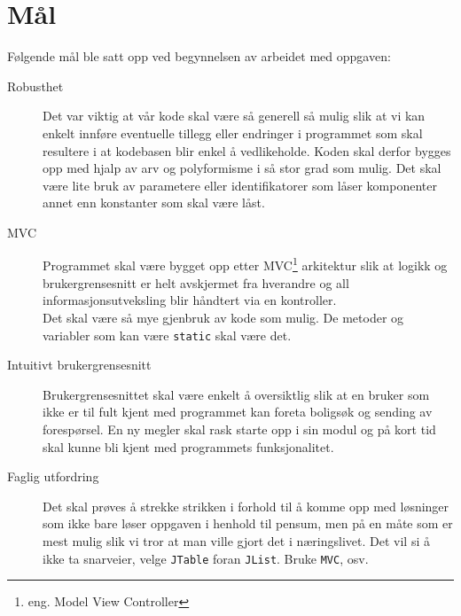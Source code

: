 \section{Mål}
Følgende mål ble satt opp ved begynnelsen av arbeidet med oppgaven:
\begin{description}
\item[Robusthet]
Det var viktig at vår kode skal være så generell så mulig slik at vi kan enkelt innføre eventuelle tillegg eller endringer i programmet som skal resultere i at kodebasen blir enkel å vedlikeholde. Koden skal derfor bygges opp med hjalp av arv og polyformisme i så stor grad som mulig. Det skal være lite bruk av parametere eller identifikatorer som låser komponenter annet enn konstanter som skal være låst.
\item[MVC]
Programmet skal være bygget opp etter MVC\footnote{eng. Model View Controller} arkitektur slik at logikk og brukergrensesnitt er helt avskjermet fra hverandre og all informasjonsutveksling blir håndtert via en kontroller. \\
Det skal være så mye gjenbruk av kode som mulig. De metoder og variabler som kan være \texttt{static} skal være det.
\item[Intuitivt brukergrensesnitt]
Brukergrensesnittet skal være enkelt å oversiktlig slik at en bruker som ikke er til fult kjent med programmet kan foreta boligsøk og sending av forespørsel. En ny megler skal rask starte opp i sin modul og på kort tid skal kunne bli kjent med programmets funksjonalitet.
\item[Faglig utfordring]
Det skal prøves å strekke strikken i forhold til å komme opp med løsninger som ikke bare løser oppgaven i henhold til pensum, men på en måte som er mest mulig slik vi tror at man ville gjort det i næringslivet. Det vil si å ikke ta snarveier, velge \texttt{JTable} foran \texttt{JList}. Bruke \texttt{MVC}, osv.
\end{description}
